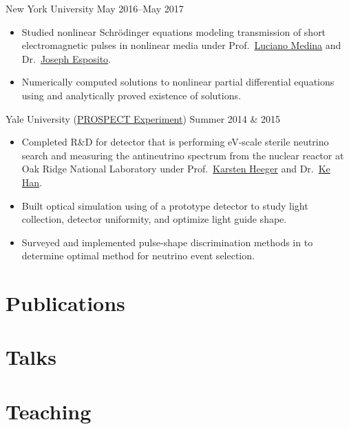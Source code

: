 \documentclass{cultvoucher}
\begin{document}
{New York University}
{May 2016--May 2017}
\begin{itemize}
	\vspace{-0.25em}
	\item Studied nonlinear Schr\"{o}dinger equations modeling transmission of short electromagnetic pulses in nonlinear media under Prof.\ \href{https://www.sites.google.com/a/nyu.edu/luciano-medina/}{Luciano Medina} and Dr.\ \href{https://cims.nyu.edu/~esposito/}{Joseph Esposito}.
	\item Numerically computed solutions to nonlinear partial differential equations using  and analytically proved existence of solutions.
\end{itemize}

{Yale University (\href{http://prospect.yale.edu/}{\small{PROSPECT Experiment}})}
{Summer 2014 \& 2015}
\begin{itemize}
	\vspace{-0.25em}
	\item Completed R\&D for detector that is performing eV-scale sterile neutrino search and measuring the antineutrino spectrum from the nuclear reactor at Oak Ridge National Laboratory under Prof.\ \href{http://heegerlab.yale.edu/karsten-heeger}{Karsten Heeger} and Dr.\ \href{https://www.physics.sjtu.edu.cn/en/people/1/kehan}{Ke Han}.
	\item Built optical simulation using  of a prototype detector to study light collection, detector uniformity, and optimize light guide shape.
	\item Surveyed and implemented pulse-shape discrimination methods in  to determine optimal method for neutrino event selection.
\end{itemize}

\section{Publications}

\section{Talks}

\section{Teaching}
\end{document}
